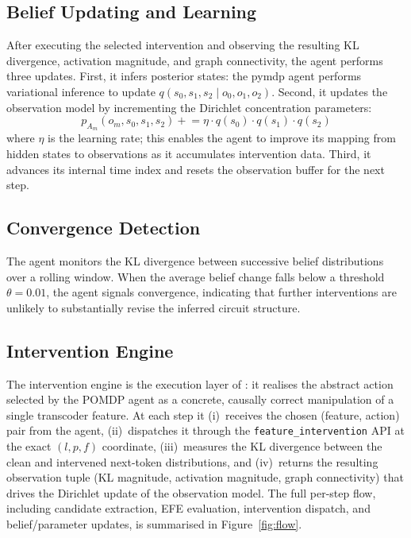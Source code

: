 \subsection{Belief Updating and Learning}

After executing the selected intervention and observing the resulting
KL divergence, activation magnitude, and graph connectivity, the agent
performs three updates.  First, it infers posterior states: the pymdp
agent performs variational inference to update
$q(s_0, s_1, s_2 \mid o_0, o_1, o_2)$.  Second, it updates the
observation model by incrementing the Dirichlet concentration
parameters:
\begin{equation}
  p_{A_m}(o_m, s_0, s_1, s_2) \mathrel{+}= \eta \cdot q(s_0) \cdot q(s_1) \cdot q(s_2)
\end{equation}
where $\eta$ is the learning rate; this enables the agent to improve
its mapping from hidden states to observations as it accumulates
intervention data.  Third, it advances its internal time index and
resets the observation buffer for the next step.


\subsection{Convergence Detection}

The agent monitors the KL divergence between successive belief
distributions over a rolling window. When the average belief change
falls below a threshold $\theta = 0.01$, the agent signals convergence,
indicating that further interventions are unlikely to substantially
revise the inferred circuit structure.


\subsection{Intervention Engine}
\label{sec:intervention_engine}

The intervention engine is the execution layer of \ACD{}: it realises
the abstract action selected by the POMDP agent as a concrete,
causally correct manipulation of a single transcoder feature.  At each
step it (i)~receives the chosen (feature, action) pair from the
agent, (ii)~dispatches it through the \texttt{feature\_intervention}
API at the exact $(l, p, f)$ coordinate, (iii)~measures the KL
divergence between the clean and intervened next-token distributions,
and (iv)~returns the resulting observation tuple (KL magnitude,
activation magnitude, graph connectivity) that drives the Dirichlet
update of the observation model.  The full per-step flow, including
candidate extraction, EFE evaluation, intervention dispatch, and
belief/parameter updates, is summarised in Figure~\ref{fig:flow}.

